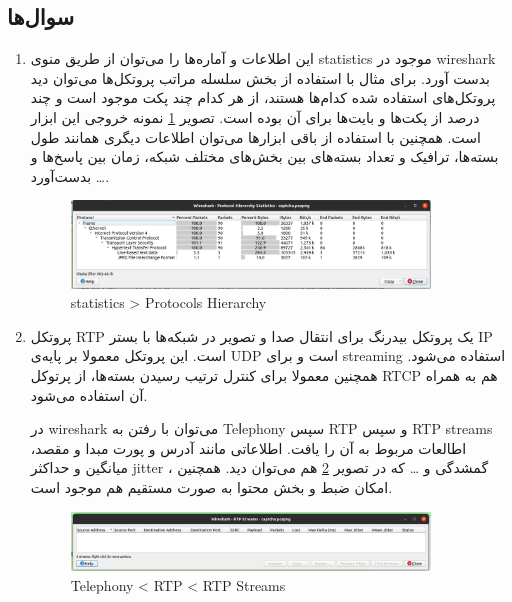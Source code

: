 \documentclass{article}
\begin{document}
\subsection{سوال‌ها}
\begin{enumerate}
    \item {
    این اطلاعات و آماره‌‌ها را می‌توان از طریق منو‌ی statistics موجود در wireshark بدست آورد. برای مثال با استفاده از بخش سلسله مراتب پروتکل‌ها می‌توان دید پروتکل‌های استفاده شده کدام‌‌ها هستند، از هر کدام چند پکت موجود است و چند درصد از پکت‌ها و بایت‌ها برای آن بوده است. تصویر \ref{fig:2} نمونه خروجی این ابزار است. همچنین با استفاده از باقی ابزار‌‌ها می‌توان اطلاعات دیگری همانند طول بسته‌ها، ترافیک و تعداد بسته‌های بین بخش‌های مختلف شبکه، زمان بین پاسخ‌ها و … بدست‌آورد.
    \begin{figure}[h!]
    	\centering
    	\includegraphics[width=0.9\textwidth]{src/2.png}
    	\caption{statistics > Protocols Hierarchy}
    	\label{fig:2}
    \end{figure}
    }
    \item {
    پروتکل RTP یک پروتکل بیدرنگ برای انتقال صدا و تصویر در شبکه‌ها با بستر IP است. این پروتکل معمولا بر پایه‌ی UDP است و برای streaming استفاده می‌شود. همچنین معمولا برای کنترل ترتیب رسیدن بسته‌ها، از پرتوکل RTCP هم به همراه آن استفاده می‌شود.
    
    در wireshark می‌توان با رفتن به Teⅼephony سپس RTP و سپس RTP streams اطالعات مربوط به آن را یافت. اطلاعاتی مانند آدرس و پورت مبدا و مقصد، میانگین و حداکثر jitter ، گمشدگی و …‬ که در تصویر \ref{fig:3} هم می‌توان دید. همچنین امکان ضبط و بخش محتوا به صورت مستقیم هم موجود است.
    \begin{figure}[h!]
    	\centering
    	\includegraphics[width=0.9\textwidth]{src/3.png}
    	\caption{‫‪Telephony‬‬ ‫>‬ ‫‪RTP‬‬ ‫>‬ ‫‪RTP‬‬ ‫‪Streams}
    	\label{fig:3}
    \end{figure}
    }
\end{enumerate}
\end{document}
